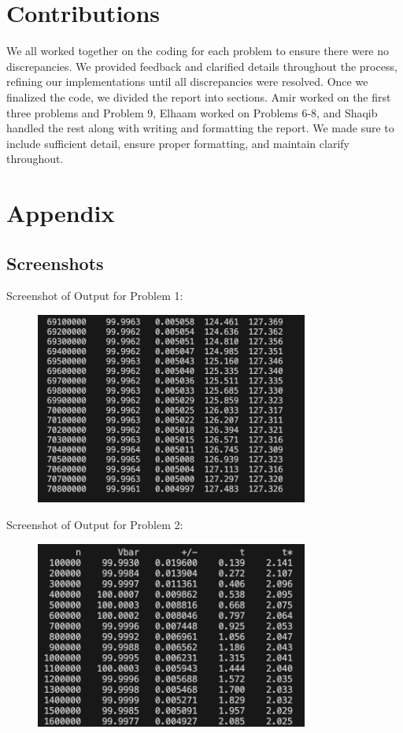 \documentclass{report}
\begin{document}
\section*{Contributions}
We all worked together on the coding for each problem to ensure there were no discrepancies. We provided feedback and clarified details throughout the process, refining our implementations until all discrepancies were resolved. Once we finalized the code, we divided the report into sections. Amir worked on the first three problems and Problem 9, Elhaam worked on Problems 6-8, and Shaqib handled the rest along with writing and formatting the report. We made sure to include sufficient detail, ensure proper formatting, and maintain clarify throughout.

\pagebreak

\section*{Appendix}
\subsection*{Screenshots}
\centerline{Screenshot of Output for Problem 1:}

\begin{figure}[H]
    \centering
    
    \includegraphics[width=0.8\textwidth]{Screenshot_1.png}
\end{figure}


\centerline{Screenshot of Output for Problem 2:}
\begin{figure}[H]
    \centering
    \includegraphics[width=0.8\textwidth]{Screenshot_2.png}
\end{figure}
\pagebreak
\end{document}

